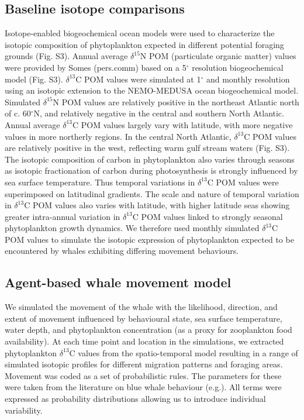 \documentclass[a4paper,12pt]{article}
\begin{document}
\subsection{Baseline isotope comparisons}
Isotope-enabled biogeochemical ocean models\cite{magozzi2017using,schmittner2016complementary} were used to characterize the isotopic composition of phytoplankton expected in different potential foraging grounds (Fig. S3). 
Annual average $\delta^{15}$N POM (particulate organic matter) values were provided by Somes (pers.comm) based on a 5$^{\circ}$ resolution biogeochemical model (Fig. S3). 
$\delta^{13}$C POM values were simulated at 1$^{\circ}$ and monthly resolution using an isotopic extension to the NEMO-MEDUSA ocean biogeochemical model\cite{magozzi2017using,yool2013medusa}. 
Simulated  $\delta^{15}$N POM values are relatively positive in the northeast Atlantic north of c. 60$^{\circ}$N, and relatively negative in the central and southern North Atlantic. 
Annual average $\delta^{13}$C POM values largely vary with latitude, with more negative values in more northerly regions. 
In the central North Atlantic, $\delta^{13}$C POM values are relatively positive in the west, reflecting warm gulf stream waters (Fig. S3). 
The isotopic composition of carbon in phytoplankton also varies through seasons as isotopic fractionation of carbon during photosynthesis is strongly influenced by sea surface temperature\cite{magozzi2017using,laws1995dependence}.
Thus temporal variations in $\delta^{13}$C POM values were superimposed on latitudinal gradients. 
The scale and nature of temporal variation in $\delta^{13}$C POM values also varies with latitude, with higher latitude seas showing greater intra-annual variation in $\delta^{13}$C POM values linked to strongly seasonal phytoplankton growth dynamics. 
We therefore used monthly simulated $\delta^{13}$C POM values to simulate the isotopic expression of phytoplankton expected to be encountered by whales exhibiting differing movement behaviours.
 
\subsection{Agent-based whale movement model}
We simulated the movement of the whale with the likelihood, direction, and extent of movement influenced by behavioural state, sea surface temperature, water depth, and phytoplankton concentration (as a proxy for zooplankton food availability). 
At each time point and location in the simulations, we extracted phytoplankton $\delta^{13}$C values from the spatio-temporal model\cite{magozzi2017using} resulting in a range of simulated isotopic profiles for different migration patterns and foraging areas. 
Movement was coded as a set of probabilistic rules. 
The parameters for these were taken from the literature on blue whale behaviour (e.g.\cite{handbook}). 
All terms were expressed as probability distributions allowing us to introduce individual variability. 
 
\end{document}
